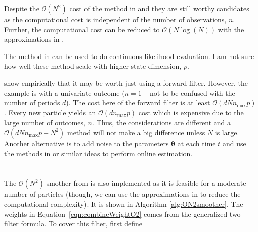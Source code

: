 \documentclass[notitlepage]{article}
\renewcommand{\vec}[1]{\bm{#1}}
\newcommand{\Lparen}[1]{\left( #1\right)}
\newcommand{\bigO}[1]{\mathcal{O}\Lparen{#1}}
\newcommand{\dimState}{p}
\newcommand{\nPart}{N}
\newcommand{\nPeriods}{d}
\newcommand{\nMax}{n_{\text{max}}}
\begin{document}
Despite the $\bigO{\nPart^2}$ cost of the method in \citet{briers09} and \cite{del10} they are still worthy candidates as the computational cost is independent of the number of observations, $n$.  Further, the computational cost can be reduced to $\bigO{\nPart\log(\nPart)}$ with the approximations in \cite{klaas06}.

The method in \citet[see particularly section 6.2 on page 203]{malik11} can be used to do continuous likelihood evaluation. I am not sure how well these method scale with higher state dimension, $\dimState$.

\citet{kantas15} show empirically that it may be worth just using a forward filter. However, the example is with a univariate outcome ($n=1$ -- not to be confused with the number of periods $\nPeriods$). The cost here of the forward filter is at least $\bigO{\nPeriods\nPart\nMax\dimState}$. Every new particle yields an $\bigO{\nPeriods\nMax\dimState}$ cost which is expensive due to the large number of outcomes, $n$. Thus, the considerations are different and a $\bigO{\nPeriods\nPart\nMax\dimState + \nPart^2}$ method will not make a big difference unless $\nPart$ is large. Another alternative is to add noise to the parameters $\vec{\theta}$ at each time $t$ and use the methods in \cite{andrieu02} or similar ideas to perform online estimation.

\section{\citet{briers09}}
The $\bigO{\nPart^2}$ smother from \citet{briers09} is also implemented as it is feasible for a moderate number of particles (though, we can use the approximations in \cite{kantas15} to reduce the computational complexity). It is shown in Algorithm \ref{alg:ON2smoother}. The weights in Equation~\eqref{eqn:combineWeightO2} comes from the generalized two-filter formula. To cover this filter, first define
\end{document}
